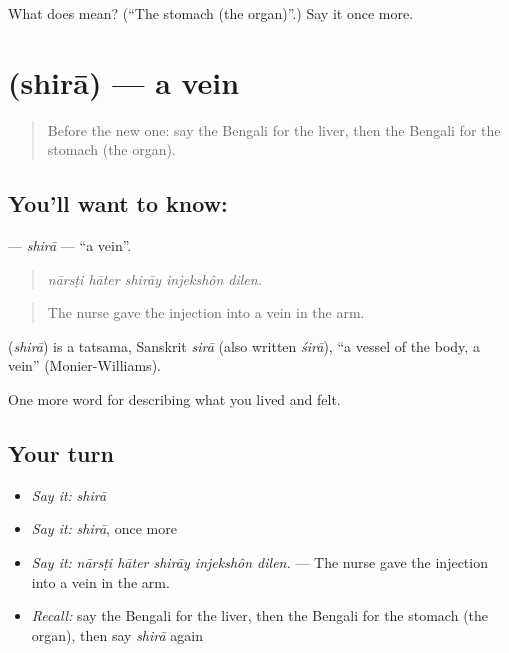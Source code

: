\begin{tcolorbox}[breakable,colback=teal!4,colframe=teal!35!black,title={Before you move on}]
What does  mean? (\textquotedblleft{}The stomach (the organ)\textquotedblright{}.) Say it once more.
\end{tcolorbox}
\section[\texorpdfstring{\bn{শিরা} (shirā)}{শিরা (shirā)}]{ (shirā) — a vein}

\label{lesson:BN-C468-shira}



\begin{quote}
Before the new one: say the Bengali for the liver, then the Bengali for the stomach (the organ).
\end{quote}

\subsection*{You'll want to know: }
\textbf{} — \emph{shirā} — \textquotedblleft{}a vein\textquotedblright{}.

\begin{quote}
    
\end{quote}

\begin{quote}
\emph{nārsṭi hāter shirāy injekshôn dilen.}
\end{quote}

\begin{quote}
The nurse gave the injection into a vein in the arm.
\end{quote}

\begin{cousinweb}
\textbf{} (\emph{shirā}) is a tatsama, Sanskrit \emph{sirā} (also written \emph{śirā}), \textquotedblleft{}a vessel of the body, a vein\textquotedblright{} (Monier-Williams).
\end{cousinweb}

\begin{grammarlens}[title={What you've built}]
One more word for describing what you lived and felt.
\end{grammarlens}

\subsection*{Your turn}
\begin{itemize}
\raggedright
  \item \emph{Say it:} \emph{shirā}
  \item \emph{Say it:} \emph{shirā}, once more
  \item \emph{Say it:} \emph{nārsṭi hāter shirāy injekshôn dilen.} — The nurse gave the injection into a vein in the arm.
  \item \emph{Recall:} say the Bengali for the liver, then the Bengali for the stomach (the organ), then say \emph{shirā} again
\end{itemize}

